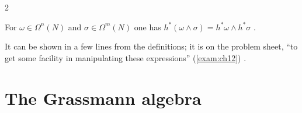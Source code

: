 \begin{paracol}{2}
\begin{proposition}\label{prop:gr-pullback-wedge}
For $\omega\in\Omega^n(N)$ and $\sigma\in\Omega^m(N)$ one has $h^*(\omega\wedge\sigma)=h^*\omega\wedge h^*\sigma$    .
\end{proposition}
It can be shown in a few lines from the definitions; it is on the problem sheet, ``to get some facility in manipulating these expressions'' (\cref{exam:ch12}) .

\section{The Grassmann algebra}\label{sec:gr-grassmann}


\end{paracol}
